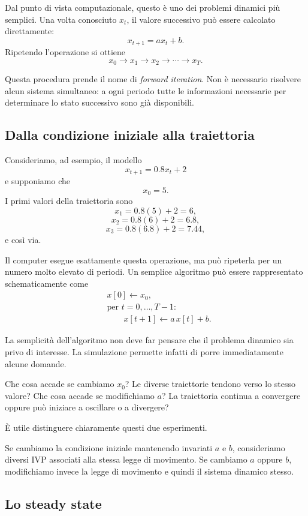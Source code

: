 \documentclass{book}
\begin{document}
Dal punto di vista computazionale, questo è uno dei problemi dinamici
più semplici. Una volta conosciuto $x_t$, il valore successivo può
essere calcolato direttamente:
\[
x_{t+1}=a x_t+b.
\]
Ripetendo l'operazione si ottiene
\[
x_0\longrightarrow x_1\longrightarrow x_2
\longrightarrow\cdots\longrightarrow x_T.
\]

Questa procedura prende il nome di \emph{forward iteration}. Non è
necessario risolvere alcun sistema simultaneo: a ogni periodo tutte le
informazioni necessarie per determinare lo stato successivo sono già
disponibili.


\subsection{Dalla condizione iniziale alla traiettoria}

Consideriamo, ad esempio, il modello
\[
x_{t+1}=0.8x_t+2
\]
e supponiamo che
\[
x_0=5.
\]
I primi valori della traiettoria sono
\[
x_1=0.8(5)+2=6,
\]
\[
x_2=0.8(6)+2=6.8,
\]
\[
x_3=0.8(6.8)+2=7.44,
\]
e così via.

Il computer esegue esattamente questa operazione, ma può ripeterla per
un numero molto elevato di periodi. Un semplice algoritmo può essere
rappresentato schematicamente come
\[
\begin{aligned}
&x[0]\leftarrow x_0,\\
&\text{per }t=0,\ldots,T-1:\\
&\qquad x[t+1]\leftarrow a\,x[t]+b.
\end{aligned}
\]

La semplicità dell'algoritmo non deve far pensare che il problema
dinamico sia privo di interesse. La simulazione permette infatti di
porre immediatamente alcune domande.

Che cosa accade se cambiamo $x_0$? Le diverse traiettorie tendono verso
lo stesso valore? Che cosa accade se modifichiamo $a$? La traiettoria
continua a convergere oppure può iniziare a oscillare o a divergere?

È utile distinguere chiaramente questi due esperimenti.

Se cambiamo la condizione iniziale mantenendo invariati $a$ e $b$,
consideriamo diversi IVP associati alla stessa legge di movimento. Se
cambiamo $a$ oppure $b$, modifichiamo invece la legge di movimento e
quindi il sistema dinamico stesso.


\subsection{Lo steady state}
\end{document}
